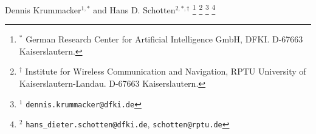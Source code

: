%
Dennis Krummacker$^{1,*}$
and
Hans D. Schotten$^{2,*,\dag}$%
%
\thanks{%
$^{*}$%
German Research Center for Artificial Intelligence GmbH, DFKI.
D-67663 Kaiserslautern.%
}%
%
\thanks{%
$^{\dag}$%
Institute for Wireless Communication and Navigation,
RPTU University of Kaiserslautern-Landau.
D-67663 Kaiserslautern.%
}%
%
\thanks{%
$^{1}$%
{\tt\small dennis.krummacker@dfki.de}
}%
%
\thanks{%
$^{2}$%
{\tt\small hans\_dieter.schotten@dfki.de}, %
{\tt\small schotten@rptu.de}
}%
%